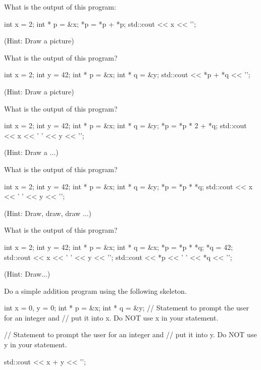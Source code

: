 \begin{ex}
What is the output of this program:
\begin{consolethree}[escapeinside=||]
int x = 2;
int * p = &x;
*p = *p + *p;
std::cout << x << '\n';
\end{consolethree}
(Hint: Draw a picture)
\end{ex}

\begin{ex}
What is the output of this program?

\begin{consolethree}[escapeinside=||]
int x = 2;
int y = 42;
int * p = &x;
int * q = &y;
std::cout << *p + *q << '\n';
\end{consolethree}
(Hint: Draw a picture)
\end{ex}

\begin{ex}
What is the output of this program?
\begin{consolethree}[escapeinside=||]
int x = 2;
int y = 42;
int * p = &x;
int * q = &y;
*p = *p * 2 + *q;
std::cout << x << ' ' << y << '\n';
\end{consolethree}
(Hint: Draw a ...)
\end{ex}

\begin{ex}
What is the output of this program?
\begin{consolethree}[escapeinside=||]
int x = 2;
int y = 42;
int * p = &x;
int * q = &y;
*p = *p * *q;
std::cout << x << ' ' << y << '\n';
\end{consolethree}
(Hint: Draw, draw, draw ...)
\end{ex}

\begin{ex}
What is the output of this program?
\begin{consolethree}[escapeinside=||]
int x = 2;
int y = 42;
int * p = &x;
int * q = &x;
*p = *p * *q;
*q = 42;
std::cout << x << ' ' << y << '\n';
std::cout << *p << ' ' << *q << '\n';
\end{consolethree}
(Hint: Draw...)
\end{ex}

\begin{ex}
Do a simple addition program using the following skeleton.
\begin{consolethree}[escapeinside=||]
int x = 0, y = 0;
int * p = &x;
int * q = &y;
// Statement to prompt the user for an integer and
// put it into x. Do NOT use x in your statement.

// Statement to prompt the user for an integer and
// put it into y. Do NOT use y in your statement.

std::cout << x + y << '\n';
\end{consolethree}
\end{ex}

